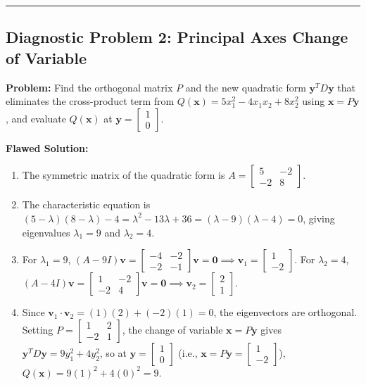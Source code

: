 \documentclass[11pt, letterpaper]{article}
\theoremstyle{definition}
\theoremstyle{remark}
\begin{document}
\medskip\hrule\medskip

\subsection*{Diagnostic Problem 2: Principal Axes Change of Variable}
\textbf{Problem:} Find the orthogonal matrix $P$ and the new quadratic form $\mathbf{y}^T D \mathbf{y}$ that eliminates the cross-product term from $Q(\mathbf{x}) = 5x_1^2 - 4x_1x_2 + 8x_2^2$ using $\mathbf{x} = P\mathbf{y}$, and evaluate $Q(\mathbf{x})$ at $\mathbf{y} = \begin{bmatrix} 1 \\ 0 \end{bmatrix}$.

\textbf{Flawed Solution:}
\begin{enumerate}
    \item The symmetric matrix of the quadratic form is $A = \begin{bmatrix} 5 & -2 \\ -2 & 8 \end{bmatrix}$.
    \item The characteristic equation is $(5-\lambda)(8-\lambda) - 4 = \lambda^2 - 13\lambda + 36 = (\lambda - 9)(\lambda - 4) = 0$, giving eigenvalues $\lambda_1 = 9$ and $\lambda_2 = 4$.
    \item For $\lambda_1 = 9$, $(A - 9I)\mathbf{v} = \begin{bmatrix} -4 & -2 \\ -2 & -1 \end{bmatrix}\mathbf{v} = \mathbf{0} \implies \mathbf{v}_1 = \begin{bmatrix} 1 \\ -2 \end{bmatrix}$.
    For $\lambda_2 = 4$, $(A - 4I)\mathbf{v} = \begin{bmatrix} 1 & -2 \\ -2 & 4 \end{bmatrix}\mathbf{v} = \mathbf{0} \implies \mathbf{v}_2 = \begin{bmatrix} 2 \\ 1 \end{bmatrix}$.
    \item Since $\mathbf{v}_1 \cdot \mathbf{v}_2 = (1)(2) + (-2)(1) = 0$, the eigenvectors are orthogonal. Setting $P = \begin{bmatrix} 1 & 2 \\ -2 & 1 \end{bmatrix}$, the change of variable $\mathbf{x} = P\mathbf{y}$ gives $\mathbf{y}^T D \mathbf{y} = 9y_1^2 + 4y_2^2$, so at $\mathbf{y} = \begin{bmatrix} 1 \\ 0 \end{bmatrix}$ (i.e., $\mathbf{x} = P\mathbf{y} = \begin{bmatrix} 1 \\ -2 \end{bmatrix}$), $Q(\mathbf{x}) = 9(1)^2 + 4(0)^2 = 9$.
\end{enumerate}
\end{document}
